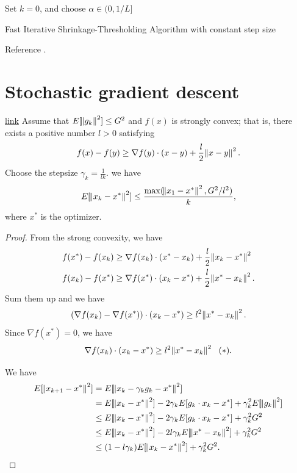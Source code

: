 \begin{refsection}
\begin{algorithm}[H]
	\SetAlgoLined
	
	Set $k = 0$, and choose $\alpha \in (0,1/L]$ \\
	\caption{Fast Iterative Shrinkage-Thresholding Algorithm with constant step size}
\end{algorithm}	

\begin{remark}
Reference \cite{beck2009fast}.	
\end{remark}


\section{Stochastic gradient descent}


\begin{theorem}\href{https://www.cs.rochester.edu/u/jliu/CSC-576/class-note-10.pdf}{link}
Assume that $E[\norm{g_k}^2]\leq G^2$ and $f(x)$ is strongly convex; that is, there exists a positive number $l>0$ satisfying 
$$f(x)-f(y) \geq \nabla f(y) \cdot(x-y) + \frac{l}{2}\norm{x-y}^2. $$
Choose the stepsize $\gamma_k = \frac{1}{lk}$. we have 
$$E[\norm{x_k - x^*}^2] \leq \frac{\max(\norm{x_1 - x^*}^2, G^2/l^2)}{k},$$
where $x^*$ is the optimizer.
\end{theorem}
\begin{proof}
From the strong convexity, we have
\begin{align*}
f(x^*) - f(x_k) &\geq \nabla f(x_k) \cdot(x^*-x_k) + \frac{l}{2}\norm{x_k-x^*}^2 \\
f(x_k) - f(x^*) &\geq \nabla f(x^*) \cdot(x_k-x^*) + \frac{l}{2}\norm{x^*-x_k}^2 .
\end{align*}
Sum them up and we have
$$(\nabla f(x_k)-\nabla f(x^*))\cdot (x_k - x^*) \geq l^2 \norm{x^*-x_k}^2.$$
Since $\nabla f(x^*) = 0$, we have
$$\nabla f(x_k)\cdot (x_k - x^*) \geq l^2 \norm{x^*-x_k}^2 ~~(*).$$

We have
\begin{align*}
E[\norm{x_{k+1} - x^*}^2] &= E[\norm{x_{k} - \gamma_k g_k - x^*}^2] \\
						  &= E[\norm{x_{k}- x^*}^2] - 2\gamma_k E[g_k\cdot {x_{k} - x^*}] + \gamma_k^2 E[\norm{g_k}^2]\\
						  &\leq E[\norm{x_{k}- x^*}^2] - 2\gamma_k E[g_k\cdot {x_{k} - x^*}] + \gamma_k^2 G^2 \\
						  &\leq E[\norm{x_{k}- x^*}^2] - 2l\gamma_k  E[\norm{x^* - x_k}^2] + \gamma_k^2 G^2 \\
						  &\leq (1 - l\gamma_k)E[\norm{x_{k}- x^*}^2] + \gamma_k^2 G^2.
\end{align*}


\end{proof}
\end{refsection}
